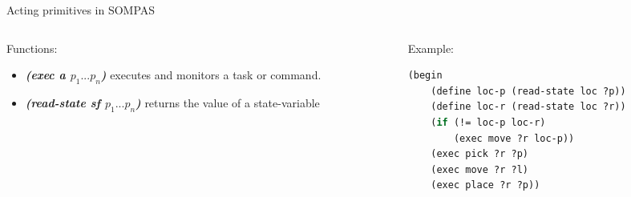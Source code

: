     
    
    

\begin{frame}[fragile]{Acting primitives in SOMPAS}
\begin{columns}
    \begin{column}{0.5\textwidth}
        Functions:
        \begin{itemize}
            \pause
                \item \textbf{\textit{(exec a $p_1...p_n$)}} executes and monitors a task or command.
            \pause
                \item \textbf{\textit{(read-state sf $p_1...p_n$)}} returns the value of a state-variable
            \end{itemize}
    \end{column}
\pause
    \begin{column}{0.5\textwidth}
           
    Example:
\small
    \lstset{columns=fullflexible}
    \begin{lstlisting}[language = lisp]
(begin
    (define loc-p (read-state loc ?p))
    (define loc-r (read-state loc ?r))
    (if (!= loc-p loc-r)
        (exec move ?r loc-p))
    (exec pick ?r ?p) 
    (exec move ?r ?l)
    (exec place ?r ?p))             
    \end{lstlisting}
    \end{column}
\end{columns}
\end{frame}

